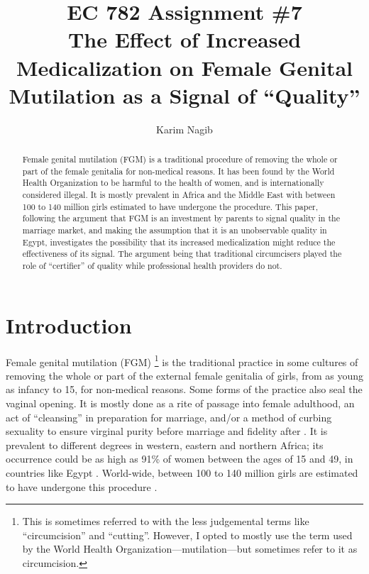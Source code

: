 \documentclass[12pt]{article}
\title{EC 782 Assignment \#7 \\ The Effect of Increased Medicalization on Female Genital Mutilation as a Signal of ``Quality''}
\author{Karim Nagib}
\begin{document}
\maketitle

  \begin{abstract}
    Female genital mutilation (FGM) is a traditional procedure of removing the whole or part of the female genitalia for non-medical reasons.  It has been found by the World Health Organization to be harmful to the health of women, and is internationally considered illegal.  It is mostly prevalent in Africa and the Middle East with between 100 to 140 million girls estimated to have undergone the procedure.  This paper, following the argument that FGM is an investment by parents to signal quality in the marriage market, and making the assumption that it is an unobservable quality in Egypt, investigates the possibility that its increased medicalization might reduce the effectiveness of its signal.  The argument being that traditional circumcisers played the role of ``certifier'' of quality while professional health providers do not.
  \end{abstract}

\section{Introduction}

Female genital mutilation (FGM) \footnote{This is sometimes referred to with the less judgemental terms like ``circumcision'' and ``cutting''. However, I opted to mostly use the term used by the World Health Organization---mutilation---but sometimes refer to it as circumcision.} is the traditional practice in some cultures of removing the whole or part of the external female genitalia of girls, from as young as infancy to 15, for non-medical reasons. Some forms of the practice also seal the vaginal opening. It is mostly done as a rite of passage into female adulthood, an act of ``cleansing'' in preparation for marriage, and/or a method of curbing sexuality to ensure virginal purity before marriage and fidelity after \citep{whofs241}. It is prevalent to different degrees in western, eastern and northern Africa; its occurrence could be as high as 91\% of women between the ages of 15 and 49, in countries like Egypt \citep{whoprev, El-Zanat}. World-wide, between 100 to 140 million girls are estimated to have undergone this procedure \citep{whofs241}.
\end{document}
